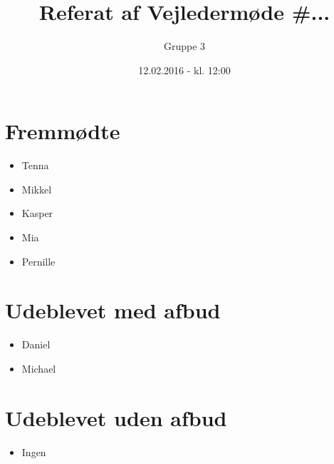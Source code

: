 \documentclass{article}
\title{Referat af Vejledermøde \#...}
\author{Gruppe 3}
\date{12.02.2016 - kl. 12:00}
\begin{document}
	\maketitle
	
	\section{Fremmødte}
	\begin{itemize}
		\item Tenna
		\item Mikkel 
		\item Kasper
		\item Mia 
		\item Pernille
	\end{itemize}
	
	\section{Udeblevet med afbud}
	\begin{itemize}
		\item Daniel
		\item Michael
	\end{itemize}
	
	\section{Udeblevet uden afbud}
	\begin{itemize}
		\item Ingen
	\end{itemize}
	
\end{document}
